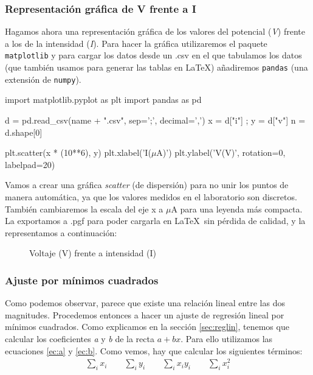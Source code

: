 \documentclass[12pt, a4paper, titlepage]{article}
\newcommand{\code}[1]{\texttt{#1}} %
\begin{document}
  \subsubsection{Representación gráfica de V frente a I}

  Hagamos ahora una representación gráfica de los valores del potencial (\textit{V}) frente a los de la intensidad (\textit{I}). Para hacer la gráfica utilizaremos el paquete \code{matplotlib} y para cargar los datos desde un .csv en el que tabulamos los datos (que también usamos para generar las tablas en \LaTeX) añadiremos \code{pandas} (una extensión de \code{numpy}).

  \begin{python}
    import matplotlib.pyplot as plt
    import pandas as pd

    d = pd.read_csv(name + ".csv", sep=';', decimal=',')
    x = d["i"] ; y = d["v"]
    n = d.shape[0]

    plt.scatter(x * (10**6), y)
    plt.xlabel('I($\mu$A)')
    plt.ylabel('V(V)', rotation=0, labelpad=20)
  \end{python}

  Vamos a crear una gráfica \textit{scatter} (de dispersión) para no unir los puntos de manera automática, ya que los valores medidos en el laboratorio son discretos. También cambiaremos la escala del eje x a $\mu$A para una leyenda más compacta. La exportamos a .pgf para poder cargarla en \LaTeX\  sin pérdida de calidad, y la representamos a continuación:

  \begin{figure}[H]
    \hspace{2.5em} 
    \caption{Voltaje (V) frente a intensidad (I)}
  \end{figure}

  \subsubsection{Ajuste por mínimos cuadrados}
  \label{sec:ajusteminres}

  Como podemos observar, parece que existe una relación lineal entre las dos magnitudes. Procedemos entonces a hacer un ajuste de regresión lineal por mínimos cuadrados. Como explicamos en la sección \ref{sec:reglin}, tenemos que calcular los coeficientes \textit{a} y \textit{b} de la recta $a + bx$. Para ello utilizamos las ecuaciones \ref{ec:a} y \ref{ec:b}. Como vemos, hay que calcular los siguientes términos:
  \begin{gather}
    \sum_i x_i \nonumber \qquad \sum_i y_i \nonumber \qquad \sum_i x_iy_i \nonumber \qquad \sum_i x_i^2 \nonumber
  \end{gather}
\end{document}

